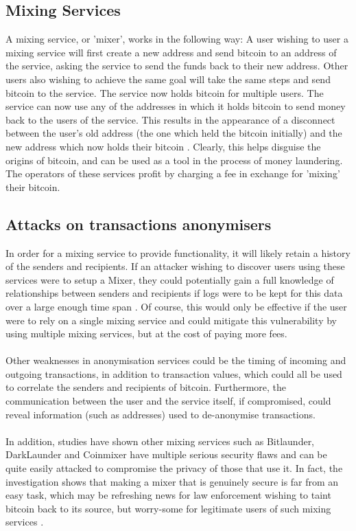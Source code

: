 \subsection{Mixing Services}\label{background-mixing-service}
A mixing service, or 'mixer', works in the following way: A user wishing to user a mixing service will first create a new address and send bitcoin to an address of the service, asking the service to send the funds back to their new address. Other users also wishing to achieve the same goal will take the same steps and send bitcoin to the service. The service now holds bitcoin for multiple users. The service can now use any of the addresses in which it holds bitcoin to send money back to the users of the service. This results in the appearance of a disconnect between the user's old address (the one which held the bitcoin initially) and the new address which now holds their bitcoin \cite{RefWorks:doc:5c3dace5e4b0613d0cda512b}. Clearly, this helps disguise the origins of bitcoin, and can be used as a tool in the process of money laundering. The operators of these services profit by charging a fee in exchange for 'mixing' their bitcoin. 

\subsection{Attacks on transactions anonymisers}
In order for a mixing service to provide functionality, it will likely retain a history of the senders and recipients. If an attacker wishing to discover users using these services were to setup a Mixer, they could potentially gain a full knowledge of relationships between senders and recipients if logs were to be kept for this data over a large enough time span \cite{RefWorks:doc:5c3dace5e4b0613d0cda512b}. Of course, this would only be effective if the user were to rely on a single mixing service and could mitigate this vulnerability by using multiple mixing services, but at the cost of paying more fees. 
\\\\
Other weaknesses in anonymisation services could be the timing of incoming and outgoing transactions, in addition to transaction values, which could all be used to correlate the senders and recipients of bitcoin. Furthermore, the communication between the user and the service itself, if compromised, could reveal information (such as addresses) used to de-anonymise transactions. 
\\\\
In addition, studies have shown other mixing services such as Bitlaunder, DarkLaunder and Coinmixer have multiple serious security flaws and can be quite easily attacked to compromise the privacy of those that use it. In fact, the investigation shows that making a mixer that is genuinely secure is far from an easy task, which may be refreshing news for law enforcement wishing to taint bitcoin back to its source, but worry-some for legitimate users of such mixing services \cite{RefWorks:doc:5c3db214e4b0854ae6124c26}. 


